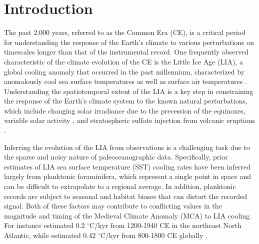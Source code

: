 \documentclass[draft]{agujournal2019}
\begin{document}
\section{Introduction}
The past 2,000 years, referred to as the Common Era (CE), is a critical period for understanding the response of the Earth's climate to various perturbations on timescales longer than that of the instrumental record. One frequently observed characteristic of the climate evolution of the CE is the Little Ice Age (LIA), a global cooling anomaly that occurred in the past millennium, characterized by anomalously cool sea surface temperatures \cite{ocean2k} as well as surface air temperatures \cite[]{Consortium--2013:Continental}. Understanding the spatiotemporal extent of the LIA is a key step in constraining the response of the Earth's climate system to the known natural perturbations, which include changing solar irradiance due to the precession of the equinoxes, variable solar activity \cite[]{lapointe2021}, and stratospheric sulfate injection from volcanic eruptions \cite[]{Buntgen-Arseneault-2020:Prominent}.

Inferring the evolution of the LIA from observations is a challenging task due to the
sparse and noisy nature of paleoceanographic data. Specifically, prior estimates of LIA sea surface temperature (SST) cooling rates have been inferred largely from planktonic foraminifera, which represent a single point in space and can be difficult to extrapolate to a regional average. In addition, planktonic records are subject to seasonal and habitat biases that can distort the recorded signal. Both of these factors may contribute to conflicting values in the magnitude and timing of the Medieval Climate Anomaly (MCA) to LIA cooling. For instance  estimated 0.2 $^{\circ}$C/kyr from 1200-1940 CE in the northeast North Atlantic, while  estimated 0.42 $^{\circ}$C/kyr from 800-1800 CE globally \cite{ocean2k}. 
\end{document}
